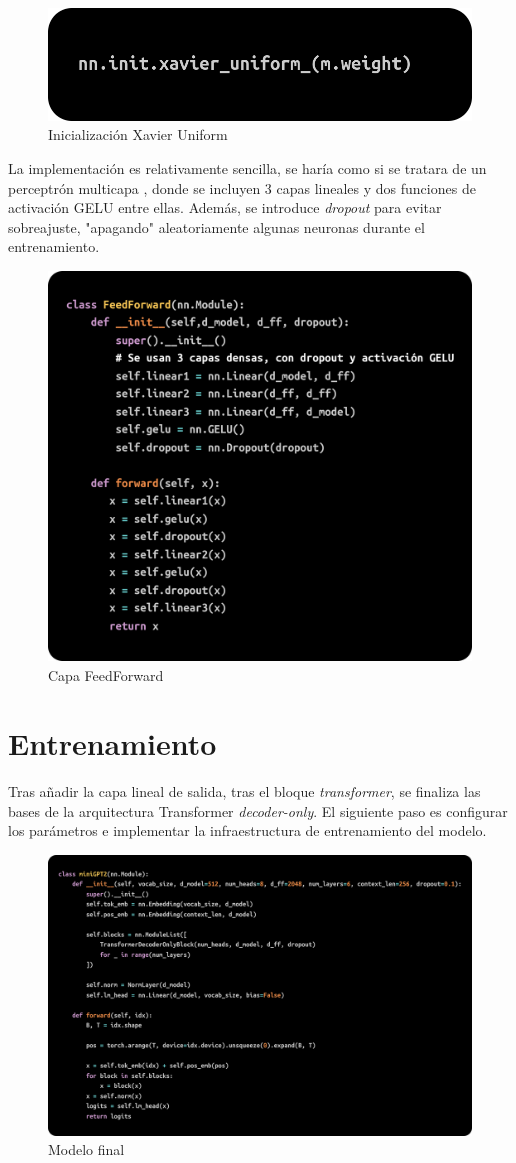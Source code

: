 \documentclass[11pt]{book}
\begin{document}
\begin{figure}[h]
    \centering
    \includegraphics[width=0.5\linewidth]{img/xavier_init.png}
    \caption{Inicialización Xavier Uniform}
    \label{fig:placeholder15}
\end{figure}

La implementación es relativamente sencilla, se haría como si se tratara de un perceptrón multicapa \parencite{kyeg_feedforward_demystified}, donde se incluyen 3 capas lineales y dos funciones de activación GELU entre ellas. Además, se introduce \textit{dropout} para evitar sobreajuste, "apagando" aleatoriamente algunas neuronas durante el entrenamiento.

\begin{figure}[h]
    \centering
    \includegraphics[width=0.5\linewidth]{img/ffnn.png}
    \caption{Capa FeedForward}
    \label{fig:placeholder16}
\end{figure}



\section{Entrenamiento}

Tras añadir la capa lineal de salida, tras el bloque \textit{transformer}, se finaliza las bases de la arquitectura Transformer \textit{decoder-only}. El siguiente paso es configurar los parámetros e implementar la infraestructura de entrenamiento del modelo. 

\begin{figure}[h]
    \centering
    \includegraphics[width=0.5\linewidth]{img/gpt2.png}
    \caption{Modelo final}
    \label{fig:placeholder19}
\end{figure}
\end{document}
